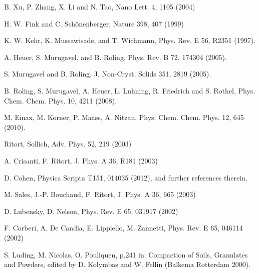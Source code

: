 \documentclass[aps,prl,floats,floatfix,twocolumn]{revtex4}
\begin{document}
\begin{thebibliography}{99}
B. Xu, P. Zhang, X. Li and N. Tao, Nano Lett. 4, 1105 (2004)

H. W. Fink and C. Sch\"onenberger, Nature 398, 407 (1999)


K. W. Kehr, K. Mussawisade, and T. Wichmann,
Phys. Rev. E 56, R2351 (1997).

A. Heuer, S. Murugavel, and B. Roling,
Phys. Rev. B 72, 174304 (2005).

S. Murugavel and B. Roling, 
J. Non-Cryst. Solids 351, 2819 (2005).

B. Roling, S. Murugavel, A. Heuer, L. Luhning, R. Friedrich and S. Rothel, 
Phys. Chem. Chem. Phys. 10, 4211 (2008).

M. Einax, M. Korner, P. Maass, A. Nitzan,
Phys. Chem. Chem. Phys. 12, 645 (2010).




Ritort, Sollich, 
Adv. Phys. 52, 219 (2003)

A. Crisanti, F. Ritort,  
J. Phys. A 36, R181 (2003) 


D. Cohen, 
Physica Scripta T151, 014035 (2012), 
and further references therein. 

M. Sales, J.-P. Bouchaud, F. Ritort, 
J. Phys. A 36, 665 (2003) 

D. Lubensky, D. Nelson, 
Phys. Rev. E 65, 031917 (2002)

F. Corberi, A. De Candia, E. Lippiello, M. Zannetti, 
Phys. Rev. E 65, 046114 (2002)

S. Luding, M. Nicolas, O. Pouliquen, 
p.241 in: Compaction of Soils, Granulates and Powders, 
edited by D. Kolymbas and W. Fellin (Balkema Rotterdam 2000).




\end{thebibliography}
\end{document}

